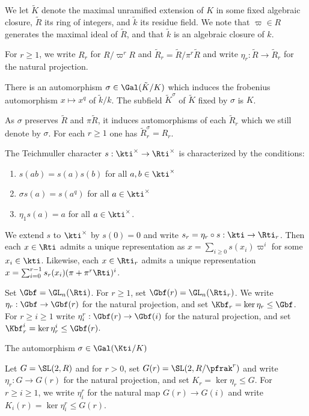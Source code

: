 We let $\tilde{K}$ denote the maximal unramified extension of $K$ in some fixed algebraic closure, $\tilde{R}$ its ring of integers, and $\tilde{k}$ its residue field. We note that $\varpi \in R$ generates the maximal ideal of $\tilde{R}$, and that $\tilde{k}$ is an algebraic closure of $k$.

For $r\geq 1$, we write $R_r$ for $R/\varpi^r R$ and $\tilde{R}_r = \tilde{R}/\pi^r \tilde{R}$ and write $\eta_r : \tilde{R} \to \tilde{R}_r$ for the natural projection.

There is an automorphism $\sigma \in \Gal(\tilde{K}/K)$ which induces the frobenius automorphism $x \mapsto x^q$  of $\tilde{k}/k$. The subfield $\tilde{K}^\sigma $ of $\tilde{K}$ fixed by $\sigma$ is $K$.


As $\sigma$ preserves $\tilde{R}$ and $\pi \tilde{R}$, it induces automorphisms of each $\tilde{R}_r$ which we still denote by $\sigma$. For each $r\geq 1$ one has $\tilde{R}_r^\sigma = R_r$.

The Teichmuller character $s: \kti^\times \to \Rti^\times$ is characterized by the conditions:
\begin{enumerate}
    \item $s(ab)=s(a)s(b)$ for all $a,b\in \kti^\times$
    \item $\sigma s(a)=s(a^q)$ for all $a\in \kti^\times$
    \item $\eta_1 s(a) = a$ for all $a\in \kti^\times$.
\end{enumerate}
We extend $s$ to $\kti^\times$ by $s(0)=0$ and write $s_r = \eta_r \circ s : \kti \to \Rti_r$. Then each $x \in \Rti$ admits a unique representation as $x = \sum_{i\geq 0} s(x_i)\varpi^i$ for some $x_i \in \kti$. Likewise, each $x \in \Rti_r$ admits a unique representation $x = \sum_{i=0}^{r-1} s_r(x_i)(\pi +\pi^r \Rti)^i$.

Set $\Gbf = \GL_n (\Rti)$. For $r\geq 1$, set $\Gbf(r) = \GL_n(\Rti_r)$. We write $\eta_r: \Gbf \to \Gbf(r)$ for the natural projection, and set $\Kbf_r  = \ker \eta_r \leq \Gbf$.  For $r \geq i \geq 1$  write $\eta_i^r : \Gbf(r) \to \Gbf(i)$ for the natural projection, and set $\Kbf_r^i = \ker \eta_r^i \leq \Gbf(r)$.

The automorphism $\sigma \in \Gal(\Kti/K)$


Let $G = \SL(2,R)$ and for $r>0$, set $G(r) = \SL(2,R/\pfrak^r)$ and write $\eta_r: G \to G(r)$ for the natural projection, and set $K_r = \ker \eta_r \leq G$. For $r \geq i \geq 1$, we write $\eta_i^r$ for the natural map $G(r) \to G(i)$ and write $K_i(r) = \ker \eta_i^r \leq G(r)$.
\cite{leiningerLengthEigenvalueEquivalence2007}
\cite{voightQuaternionAlgebras2021}
